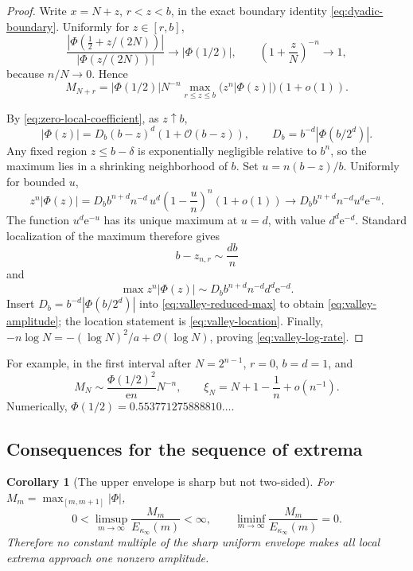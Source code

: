 \documentclass[11pt,oneside]{article}
\newtheorem{corollary}[corollary]{Corollary}
\theoremstyle{definition}
\theoremstyle{remark}
\newcommand{\e}{\mathrm e}
\newcommand{\Phiup}{\Phi}
\newcommand{\bigO}{\mathcal O}
\newcommand{\abs}[1]{\left|#1\right|}
\begin{document}
\begin{proof}
Write $x=N+z$, $r<z<b$, in the exact boundary identity
\eqref{eq:dyadic-boundary}.  Uniformly for $z\in[r,b]$,
\begin{equation}
 \frac{\abs{\Phiup(\tfrac12+z/(2N))}}
      {\abs{\Phiup(z/(2N))}}
 \longrightarrow\abs{\Phiup(1/2)},
 \qquad
 \left(1+\frac zN\right)^{-n}\longrightarrow1,
 \label{eq:valley-uniform-factors}
\end{equation}
because $n/N\to0$.  Hence
\begin{equation}
 M_{N+r}
 =\abs{\Phiup(1/2)}N^{-n}
   \max_{r\le z\le b}\bigl(z^n\abs{\Phiup(z)}\bigr)(1+o(1)).
 \label{eq:valley-reduced-max}
\end{equation}

By \eqref{eq:zero-local-coefficient}, as $z\uparrow b$,
\[
 \abs{\Phiup(z)}
 =D_b(b-z)^d(1+\bigO(b-z)),
 \qquad
 D_b=b^{-d}\abs{\Phiup(b/2^d)}.
\]
Any fixed region $z\le b-\delta$ is exponentially negligible relative to $b^n$, so the
maximum lies in a shrinking neighborhood of $b$.  Set
$u=n(b-z)/b$.  Uniformly for bounded $u$,
\[
 z^n\abs{\Phiup(z)}
 =D_b b^{n+d}n^{-d}\,u^d\left(1-\frac un\right)^n(1+o(1))
 \longrightarrow
 D_b b^{n+d}n^{-d}u^d\e^{-u}.
\]
The function $u^d\e^{-u}$ has its unique maximum at $u=d$, with value $d^d\e^{-d}$.
Standard localization of the maximum therefore gives
\[
 b-z_{n,r}\sim\frac{db}{n}
\]
and
\[
 \max z^n\abs{\Phiup(z)}
 \sim D_b b^{n+d}n^{-d}d^d\e^{-d}.
\]
Insert $D_b=b^{-d}\abs{\Phiup(b/2^d)}$ into
\eqref{eq:valley-reduced-max} to obtain \eqref{eq:valley-amplitude}; the location statement
is \eqref{eq:valley-location}.  Finally,
$-n\log N=-(\log N)^2/a+\bigO(\log N)$, proving
\eqref{eq:valley-log-rate}.
\end{proof}

For example, in the first interval after $N=2^{n-1}$, $r=0$, $b=d=1$, and
\begin{equation}
 M_N\sim\frac{\Phiup(1/2)^2}{\e n}N^{-n},
 \qquad
 \xi_N=N+1-\frac1n+o(n^{-1}).
 \label{eq:first-dyadic-valley}
\end{equation}
Numerically,
$\Phiup(1/2)=0.553771275888810\ldots$.

\subsection{Consequences for the sequence of extrema}

\begin{corollary}[The upper envelope is sharp but not two-sided]
\label{cor:extrema-limsup-liminf}
For $M_m=\max_{[m,m+1]}\abs{\Phiup}$,
\begin{equation}
 0<\limsup_{m\to\infty}\frac{M_m}{E_{\kappa_\infty}(m)}<\infty,
 \qquad
 \liminf_{m\to\infty}\frac{M_m}{E_{\kappa_\infty}(m)}=0.
 \label{eq:extrema-limsup-liminf}
\end{equation}
Therefore no constant multiple of the sharp uniform envelope makes all local extrema
approach one nonzero amplitude.
\end{corollary}
\end{document}
